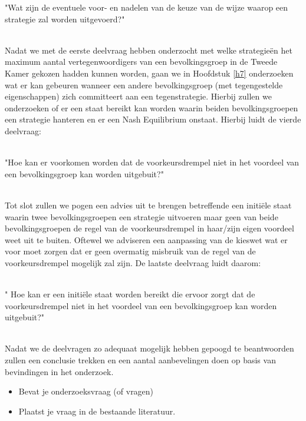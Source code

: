 \begin{SDV}"Wat zijn de eventuele voor- en nadelen van de keuze van de wijze waarop een strategie zal worden uitgevoerd?"\\\
\end{SDV}


Nadat we met de eerste deelvraag hebben onderzocht met welke strategie\"{e}n het maximum aantal vertegenwoordigers van een bevolkingsgroep in de Tweede Kamer gekozen hadden kunnen worden, gaan we in Hoofdstuk \ref{h7} onderzoeken wat er kan gebeuren wanneer een andere bevolkingsgroep (met tegengestelde eigenschappen) zich committeert aan een tegenstrategie. Hierbij zullen we onderzoeken of er een staat bereikt kan worden waarin beiden bevolkingsgroepen een strategie hanteren en er een Nash Equilibrium onstaat. Hierbij luidt de vierde deelvraag: \\\

\begin{DV}"Hoe kan er voorkomen worden dat de voorkeursdrempel niet in het voordeel van een bevolkingsgroep kan worden uitgebuit?"\\\
\end{DV}

Tot slot zullen we pogen een advies uit te brengen betreffende een initi\"{e}le staat waarin twee bevolkingsgroepen een strategie uitvoeren maar geen van beide bevolkingsgroepen de regel van de voorkeursdrempel in haar/zijn eigen voordeel weet uit te buiten. Oftewel we adviseren een aanpassing van de kieswet wat er voor moet zorgen dat er geen overmatig misbruik van de regel van de voorkeursdrempel mogelijk zal zijn. De laatste deelvraag luidt daarom: \\\

\begin{DV}" Hoe kan er een initi\"{e}le staat worden bereikt die ervoor zorgt dat de voorkeursdrempel niet in het voordeel van een bevolkingsgroep kan worden uitgebuit?"\\\
\end{DV}

Nadat we de deelvragen zo adequaat mogelijk hebben gepoogd te beantwoorden zullen een conclusie trekken en een aantal aanbevelingen doen op basis van bevindingen in het onderzoek. 






\iffalse
\begin{itemize}
\item Bevat je onderzoeksvraag (of vragen)
\item Plaatst je vraag in de bestaande literatuur.
\end{itemize}

